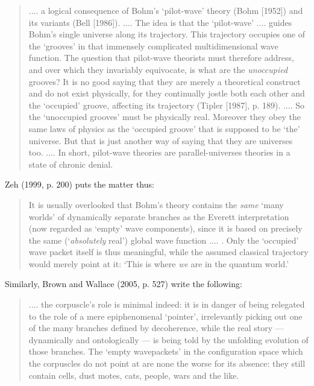 \documentclass[12pt]{article}%
\begin{document}
\begin{quote}
.... a logical consequence of Bohm's `pilot-wave' theory (Bohm [1952]) and its
variants (Bell [1986]). .... The idea is that the `pilot-wave' .... guides
Bohm's single universe along its trajectory. This trajectory occupies one of
the `grooves' in that immensely complicated multidimensional wave function.
The question that pilot-wave theorists must therefore address, and over which
they invariably equivocate, is what are the \textit{unoccupied} grooves? It is
no good saying that they are merely a theoretical construct and do not exist
physically, for they continually jostle both each other and the `occupied'
groove, affecting its trajectory (Tipler [1987], p. 189). .... So the
`unoccupied grooves' must be physically real. Moreover they obey the same laws
of physics as the `occupied groove' that is supposed to be `the' universe. But
that is just another way of saying that they are universes too. .... In short,
pilot-wave theories are parallel-universes theories in a state of chronic denial.
\end{quote}

Zeh (1999, p. 200) puts the matter thus:

\begin{quote}
It is usually overlooked that Bohm's theory contains the \textit{same} `many
worlds' of dynamically separate branches as the Everett interpretation (now
regarded as `empty' wave components), since it is based on precisely the same
(`\textit{absolutely} real') global wave function .... . Only the `occupied'
wave packet itself is thus meaningful, while the assumed classical trajectory
would merely point at it: `This is where \textit{we} are in the quantum world.'
\end{quote}

Similarly, Brown and Wallace (2005, p. 527) write the following:

\begin{quote}
.... the corpuscle's role is minimal indeed: it is in danger of being
relegated to the role of a mere epiphenomenal `pointer', irrelevantly picking
out one of the many branches defined by decoherence, while the real story ---
dynamically and ontologically --- is being told by the unfolding evolution of
those branches. The `empty wavepackets' in the configuration space which the
corpuscles do not point at are none the worse for its absence: they still
contain cells, dust motes, cats, people, wars and the like.
\end{quote}
\end{document}

